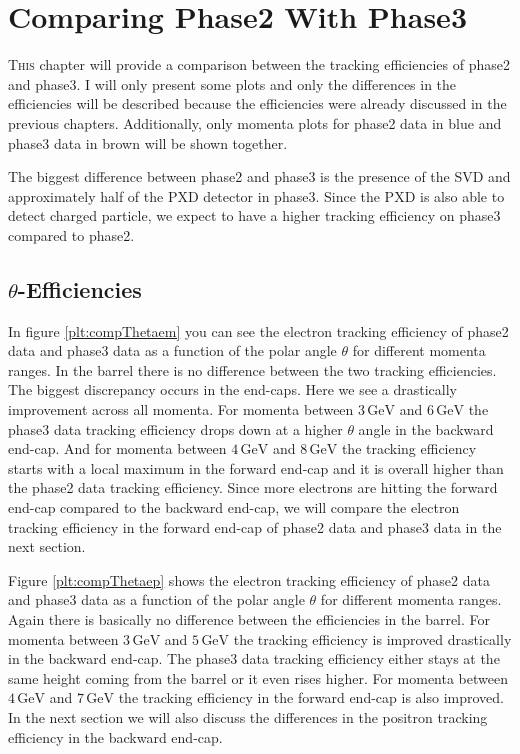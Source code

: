 \documentclass[a4paper,11pt,twosided,final,german,openbib,pdftex,listof=totoc,bibliography=totoc]{scrbook}
\begin{document}
\chapter{Comparing Phase2 With Phase3}
\label{cha:Comp}


\lettrine{T}{his} chapter will provide a comparison between the tracking efficiencies of phase2 and phase3. I will only present some plots and only the differences in the efficiencies will be described because the efficiencies were already discussed in the previous chapters. Additionally, only momenta plots for phase2 data in blue and phase3 data in brown will be shown together.
\newline

The biggest difference between phase2 and phase3 is the presence of the SVD and approximately half of the PXD detector in phase3.
Since the PXD is also able to detect charged particle, we expect to have a higher tracking efficiency on phase3 compared to phase2.

\section{$\theta$-Efficiencies}


In figure \ref{plt:compThetaem} you can see the electron tracking efficiency of phase2 data and phase3 data as a function of the polar angle $\theta$ for different momenta ranges. In the barrel there is no difference between the two tracking efficiencies. The biggest discrepancy occurs in the end-caps. Here we see a drastically improvement across all momenta. 
For momenta between $3\,\textrm{GeV}$ and $6\,\textrm{GeV}$ the phase3 data tracking efficiency drops down at a higher $\theta$ angle in the backward end-cap. 
And for momenta between $4\,\textrm{GeV}$ and $8\,\textrm{GeV}$ the tracking efficiency starts with a local maximum in the forward end-cap and it is overall higher than the phase2 data tracking efficiency. Since more electrons are hitting the forward end-cap compared to the backward end-cap, we will compare the electron tracking efficiency in the forward end-cap of phase2 data and phase3 data in the next section. 


Figure \ref{plt:compThetaep} shows the electron tracking efficiency of phase2 data and phase3 data as a function of the polar angle $\theta$ for different momenta ranges. Again there is basically no difference between the efficiencies in the barrel. 
For momenta between $3\,\textrm{GeV}$ and $5\,\textrm{GeV}$ the tracking efficiency is improved drastically in the backward end-cap. The phase3 data tracking efficiency either stays at the same height coming from the barrel or it even rises higher. 
For momenta between $4\,\textrm{GeV}$ and $7\,\textrm{GeV}$ the tracking efficiency in the forward end-cap is also improved. In the next section we will also discuss the differences in the positron tracking efficiency in the backward end-cap.
\end{document}
